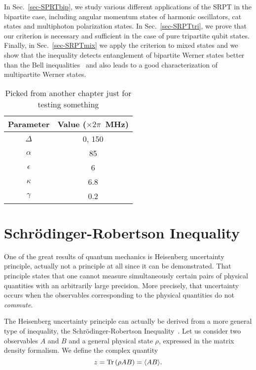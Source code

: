 In Sec.~\ref{sec-SPRTbip}, we study various different applications of the SRPT in the bipartite case, including angular momentum states of harmonic oscillators, cat states and multiphoton polarization states. In Sec.~\ref{sec-SRPTtri}, we prove that our criterion is necessary and sufficient in the case of pure tripartite qubit states. Finally, in Sec.~\ref{sec-SRPTmix} we apply the criterion to mixed states and we show that the inequality detects entanglement of bipartite Werner states better than the Bell inequalities~\cite{Bel64} and also leads to a good characterization of multipartite Werner states.

\begin{table} \begin{center}
  \begin{tabular}{c|c}
      Parameter    & Value ($\times 2 \pi$~MHz) \\ \hline \hline
      $\Delta$     & 0, 150                     \\
      ${\alpha}$   & 85                         \\
      ${\epsilon}$ & 6                          \\
      ${\kappa}$   & 6.8                        \\
      ${\gamma}$   & 0.2
  \end{tabular}
  \caption{Picked from another chapter just for testing something}
\end{center}\end{table}

\section{Schr\"odinger-Robertson Inequality} \label{sec-SRI}

One of the great results of quantum mechanics is Heisenberg uncertainty principle, actually not a principle at all since it can be demonstrated. That principle states that one cannot measure simultaneously certain pairs of physical quantities with an arbitrarily large precision. More precisely, that uncertainty occurs when the observables corresponding to the physical quantities do not \emph{commute}.

The Heisenberg uncertainty principle can actually be derived from a more general type of inequality, the Schr\"odinger-Robertson Inequality~\cite{Sch30}. Let us consider two observables $A$ and $B$ and a general physical state $\rho$, expressed in the matrix density formalism. We define the complex quantity
\[ z=\mbox{\textup{Tr}}\left( \rho A B \right)= \langle AB \rangle.\]


